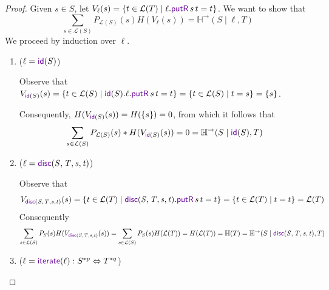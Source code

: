 \documentclass[acmsmall,screen,anonymous]{acmart}
\begin{document}
\begin{proof}
Given $s \in S$, let $V_{\ell}(s) = \{t \in \mathcal{L}(T) \; | \; \ell.\PutROf{s}{t} = t\}$. We want to show that
$$\sum_{s \in \mathcal{L}(S)}P_{\mathcal{L}(S)}(s)H(V_{\ell}(s)) = \mathbb{H}^{\rightarrow}(S \; | \; \ell, T)$$
We proceed by induction over $\ell$. 
\begin{enumerate}
\item
($\ell = \IdentityLensOf{S}$)

Observe that $V_{\IdentityLensOf{S}}(s) = \{t \in \mathcal{L}(S) \; | \; \IdentityLensOf{S}.\ell.\PutROf{s}{t} = t\} = \{t \in \mathcal{L}(S) \; | \; t = s\} = \{s\}$.

Consequently, $H(V_{\IdentityLensOf{S}}(s)) = H(\{s\}) = 0$, from which it follows that 
$$\sum_{s \in \mathcal{L}(S)} P_{\mathcal{L}(S)}(s) * H(V_{\IdentityLensOf{S}}(s)) = 0 = \mathbb{H}^{\rightarrow}(S \; | \; \IdentityLensOf{S}, T)$$
\item
($\ell = \DisconnectOf{\Regex}{\RegexAlt}{\String}{\StringAlt}$)

Observe that 
$$V_{\DisconnectOf{\Regex}{\RegexAlt}{\String}{\StringAlt}}(s) = \{t \in \mathcal{L}(T) \; | \; \DisconnectOf{\Regex}{\RegexAlt}{\String}{\StringAlt}.\PutROf{s}{t} = t\} = \{t \in \mathcal{L}(T) \; | \; t = t\} = \mathcal{L}(T)$$
Consequently
$$\sum_{s \in \mathcal{L}(S)}P_{S}(s)H(V_{\DisconnectOf{\Regex}{\RegexAlt}{\String}{\StringAlt}}(s)) = \sum_{s \in \mathcal{L}(S)}P_{S}(s)H(\mathcal{L}(T)) = H(\mathcal{L}(T)) = \mathbb{H}(T) = \mathbb{H}^{\rightarrow}(S \; | \; \DisconnectOf{\Regex}{\RegexAlt}{\String}{\StringAlt}, T)$$
\item
($\ell = \IterateLensOf{\Lens} : S^{*p} \Leftrightarrow T^{*q}$)


\end{enumerate}
\end{proof}
\end{document}
